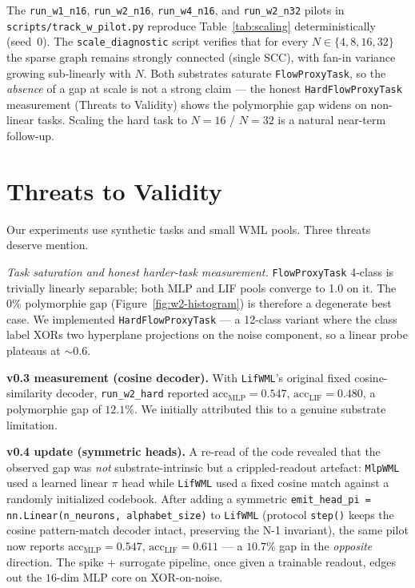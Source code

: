 \documentclass[10pt,twocolumn]{article}
\begin{document}
The \texttt{run\_w1\_n16}, \texttt{run\_w2\_n16}, \texttt{run\_w4\_n16},
and \texttt{run\_w2\_n32} pilots in \texttt{scripts/track\_w\_pilot.py}
reproduce Table~\ref{tab:scaling} deterministically (seed~0). The
\texttt{scale\_diagnostic} script verifies that for every
$N \in \{4, 8, 16, 32\}$ the sparse graph remains strongly connected
(single SCC), with fan-in variance growing sub-linearly with $N$.
Both substrates saturate \texttt{FlowProxyTask}, so the \emph{absence}
of a gap at scale is not a strong claim --- the honest
\texttt{HardFlowProxyTask} measurement (Threats to Validity) shows
the polymorphie gap widens on non-linear tasks. Scaling the hard
task to $N = 16$ / $N = 32$ is a natural near-term follow-up.

\section{Threats to Validity}

Our experiments use synthetic tasks and small WML pools. Three threats deserve mention.

\textit{Task saturation and honest harder-task measurement.} \texttt{FlowProxyTask} 4-class is trivially linearly separable; both MLP and LIF pools converge to 1.0 on it. The 0\% polymorphie gap (Figure~\ref{fig:w2-histogram}) is therefore a degenerate best case. We implemented \texttt{HardFlowProxyTask} --- a 12-class variant where the class label XORs two hyperplane projections on the noise component, so a linear probe plateaus at $\sim 0.6$.

\textbf{v0.3 measurement (cosine decoder).} With \texttt{LifWML}'s original fixed cosine-similarity decoder, \texttt{run\_w2\_hard} reported $\text{acc}_{\text{MLP}} = 0.547$, $\text{acc}_{\text{LIF}} = 0.480$, a polymorphie gap of $12.1\%$. We initially attributed this to a genuine substrate limitation.

\textbf{v0.4 update (symmetric heads).} A re-read of the code revealed that the observed gap was \emph{not} substrate-intrinsic but a crippled-readout artefact: \texttt{MlpWML} used a learned linear $\pi$ head while \texttt{LifWML} used a fixed cosine match against a randomly initialized codebook. After adding a symmetric \texttt{emit\_head\_pi = nn.Linear(n\_neurons, alphabet\_size)} to \texttt{LifWML} (protocol \texttt{step()} keeps the cosine pattern-match decoder intact, preserving the N-1 invariant), the same pilot now reports $\text{acc}_{\text{MLP}} = 0.547$, $\text{acc}_{\text{LIF}} = 0.611$ --- a $10.7\%$ gap in the \emph{opposite} direction. The spike + surrogate pipeline, once given a trainable readout, edges out the $16$-dim MLP core on XOR-on-noise.
\end{document}
